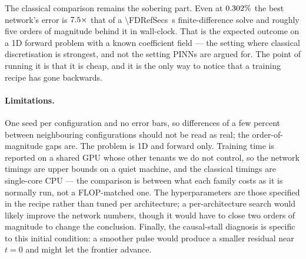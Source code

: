The classical comparison remains the sobering part. Even at $0.302\%$ the
best network's error is $7.5\times$ that of a
\SI{\FDRefSecs}{\second}
finite-difference solve and roughly five orders of magnitude behind it in
wall-clock. That is the expected outcome on a 1D forward problem with a known
coefficient field --- the setting where classical discretisation is strongest,
and not the setting PINNs are argued for. The point of running it is that it is
cheap, and it is the only way to notice that a training recipe has gone
backwards.

\paragraph{Limitations.} One seed per configuration and no error bars, so
differences of a few percent between neighbouring configurations should not be
read as real; the order-of-magnitude gaps are. The problem is 1D and forward
only. Training time is reported on a shared GPU whose other tenants we do not
control, so the network timings are upper bounds on a quiet machine, and the
classical timings are single-core CPU --- the comparison is between what each
family costs as it is normally run, not a FLOP-matched one. The hyperparameters
are those specified in the recipe rather than tuned per architecture; a
per-architecture search would likely improve the network numbers, though it
would have to close two orders of magnitude to change the conclusion. Finally,
the causal-stall diagnosis is specific to this initial condition: a smoother
pulse would produce a smaller residual near $t = 0$ and might let the frontier
advance.
